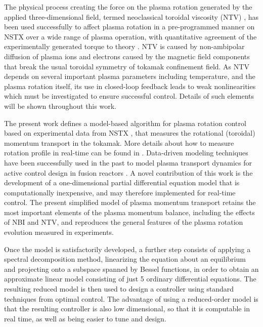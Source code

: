 \documentclass[12pt,lot, lof]{puthesis}
\begin{document}
The physical process creating the force on the plasma rotation generated by the applied three-dimensional field, termed neoclassical toroidal viscosity (NTV) \cite{Shaing88, Shaing10, Shaing15}, has been used successfully to affect plasma rotation in a pre-programmed manner on NSTX over a wide range of plasma operation, with quantitative agreement of the experimentally generated torque to theory \cite{Zhu06}. NTV is caused by non-ambipolar diffusion of plasma ions and electrons caused by the magnetic field components that break the usual toroidal symmetry of tokamak confinement field. As NTV depends on several important plasma parameters including temperature, and the plasma rotation itself, its use in closed-loop feedback leads to weak nonlinearities which must be investigated to ensure successful control. Details of such elements will be shown throughout this work. 

The present work defines a model-based algorithm for plasma rotation control
based on experimental data from NSTX \cite{Ono00}, that measures the rotational
(toroidal) momentum transport in the tokamak.
More details about how to measure rotation profile in real-time can be found in \cite{Zhu06, Podesta12}.
Data-driven modeling techniques
have been successfully used in the past to model plasma transport dynamics for
active control design in fusion reactors \cite{Moreau13, Boyer133, Boyer144,
  Barton12}. A novel contribution of this work is the development of a
one-dimensional partial differential equation model that is computationally
inexpensive, and may therefore implemented for real-time control.
%
The present simplified model of plasma momentum transport retains the most
important elements of the plasma momentum balance, including the effects of NBI
and NTV, and reproduces the general features of the plasma rotation evolution
measured in experiments.

Once the model is satisfactorily developed, a further step consists of applying
a spectral decomposition method, linearizing the equation about an equilibrium
and projecting onto a subspace spanned by Bessel functions, in order to obtain
an approximate linear model consisting of just 5 ordinary differential
equations.
%
The resulting reduced model is then used to design a controller using standard
techniques from optimal control.
%
The advantage of using a reduced-order model is that the resulting controller is
also low dimensional, so that it is computable in real time, as well as being
easier to tune and design.
 
\end{document}
